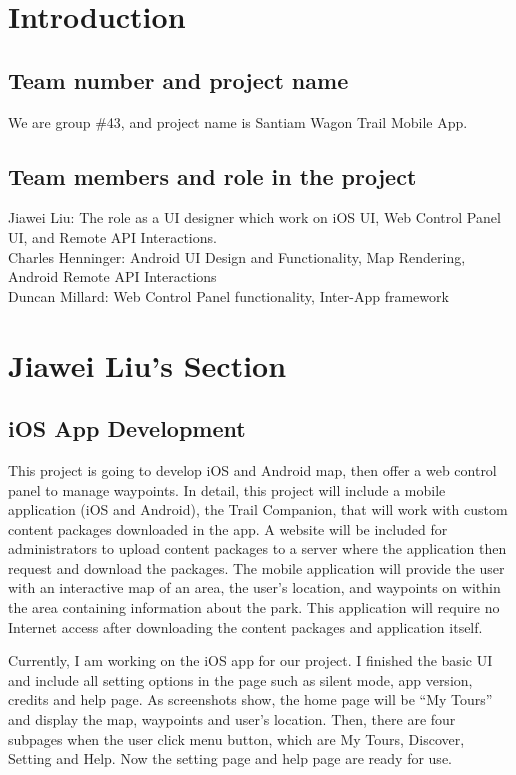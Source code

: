 \documentclass[letterpaper, 10pt,titlepage]{article}
\begin{document}
\tableofcontents
\newpage



\section{Introduction}
\subsection{Team number and project name}
We are group \#43, and project name is Santiam Wagon Trail Mobile App.


\subsection{Team members and role in the project}
Jiawei Liu: The role as a UI designer which work on iOS UI, Web Control Panel UI, and Remote API Interactions. \\
Charles Henninger: Android UI Design and Functionality, Map Rendering, Android Remote API Interactions\\
Duncan Millard: Web Control Panel functionality, Inter-App framework


\vspace{0.3cm}




\section{Jiawei Liu's Section}

\subsection{iOS App Development}
This project is going to develop iOS and Android map, then offer a web control panel to manage waypoints. In detail, this project will include a mobile application (iOS and Android), the Trail Companion, that will work with custom content packages downloaded in the app. A website will be included for administrators to upload content packages to a server where the application then request and download the packages. The mobile application will provide the user with an interactive map of an area, the user’s location, and waypoints on within the area containing information about the park. This application will require no Internet access after downloading the content packages and application itself.
 
Currently, I am working on the iOS app for our project. I finished the basic UI and include all setting options in the page such as silent mode, app version, credits and help page. As screenshots show, the home page will be “My Tours” and display the map, waypoints and user’s location. Then, there are four subpages when the user click menu button, which are My Tours, Discover, Setting and Help. Now the setting page and help page are ready for use.
 
\end{document}
